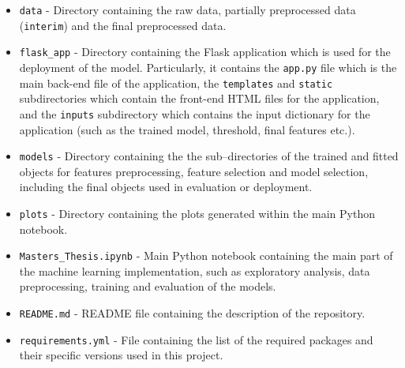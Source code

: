 \begin{itemize}\setlength\itemsep{0em}
\item \texttt{data} - Directory containing the raw data, partially preprocessed data (\texttt{interim}) and the final preprocessed data.
\item \texttt{flask\_app} - Directory containing the Flask application which is used for the deployment of the model. Particularly, it contains the \texttt{app.py} file which is the main back-end file of the application, the \texttt{templates} and \texttt{static} subdirectories which contain the front-end HTML files for the application, and the \texttt{inputs} subdirectory which contains the input dictionary for the application (such as the trained model, threshold, final features etc.).
\item \texttt{models} - Directory containing the the sub--directories of the trained and fitted objects for features preprocessing, feature selection and model selection, including the final objects used in evaluation or deployment.
\item \texttt{plots} - Directory containing the plots generated within the main Python notebook.
\item \texttt{Masters\_Thesis.ipynb} - Main Python notebook containing the main part of the machine learning implementation, such as exploratory analysis, data preprocessing, training and evaluation of the models.
\item \texttt{README.md} - README file containing the description of the repository.
\item \texttt{requirements.yml} - File containing the list of the required packages and their specific versions used in this project.
\end{itemize}


